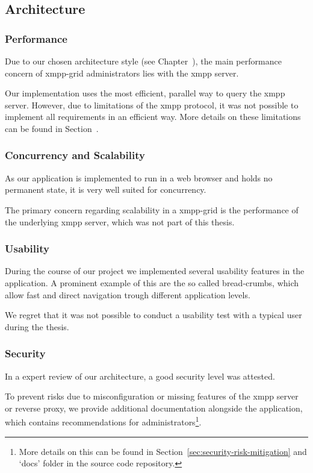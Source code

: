 \subsection{Architecture}

\subsubsection{Performance}
Due to our chosen architecture style (see Chapter~),
the main performance concern of \gls{xmpp-grid} administrators lies with the \gls{xmpp} server.

Our implementation uses the most efficient, parallel way to query the \gls{xmpp} server.
However, due to limitations of the \gls{xmpp} protocol, it was not possible to implement all requirements in an efficient way.
More details on these limitations can be found in Section~.

\subsubsection{Concurrency and Scalability}
As our application is implemented to run in a web browser and holds no permanent state, it is very well suited for concurrency.

The primary concern regarding scalability in a \gls{xmpp-grid} is the performance of the underlying \gls{xmpp} server, which was not part of this thesis.


\subsubsection{Usability}
During the course of our project we implemented several usability features in the application.
A prominent example of this are the so called bread-crumbs, which allow fast and direct navigation trough different application levels.

We regret that it was not possible to conduct a usability test with a typical user during the thesis.

\subsubsection{Security}
In a expert review of our architecture, a good security level was attested.

To prevent risks due to misconfiguration or missing features of the \gls{xmpp} server or reverse proxy, we provide additional documentation alongside the application, which contains recommendations for administrators\footnote{More details on this can be found in Section~\ref{sec:security-risk-mitigation} and `docs' folder in the source code repository.}.

